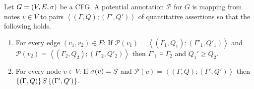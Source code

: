 \documentclass[letterpaper,11pt]{article}
\begin{document}
Let $G = (V,E,\sigma)$ be a CFG. A potential annotation $\mathcal{P}$
for $G$ is mapping from notes $v \in V$ to pairs
$\left<(\Gamma,Q);(\Gamma',Q')\right>$ of quantitative assertions so
that the following holds.
%
\begin{enumerate}
\item  For every edge $(v_1,v_2) \in E$: 
  If $\mathcal{P}(v_1) = \left<(\Gamma_1,Q_1);(\Gamma'_1,Q'_1)\right>$ and 
   $\mathcal{P}(v_2) = \left<(\Gamma_2,Q_2);(\Gamma'_2,Q'_2)\right>$ then
   $\Gamma'_1 \models \Gamma_2$ and $Q_1' \geq Q_2$.
 \item For every node $v \in V$: If $\sigma(v) = S$ and
   $\mathcal{P}(v) = \left<(\Gamma,Q);(\Gamma',Q')\right>$ then
  $\{(\Gamma,Q)\}\, S\, \{(\Gamma',Q')\}$.
\end{enumerate}



\end{document}
